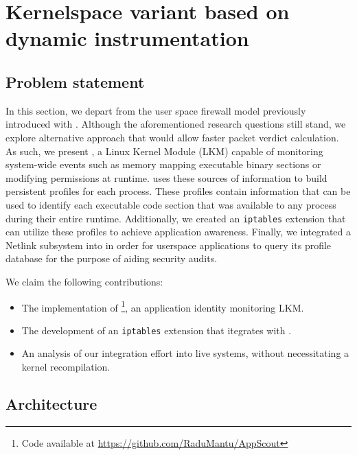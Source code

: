 \section{Kernelspace variant based on dynamic instrumentation}
\label{appfw:appscout}

\subsection{Problem statement}
\label{apffw:appscout:intro}

In this section, we depart from the user space firewall model previously introduced with \daf{}. Although the aforementioned research questions still stand, we explore alternative approach that would allow faster packet verdict calculation. As such, we present \scout{}, a Linux Kernel Module (LKM) capable of monitoring system-wide events such as memory mapping executable binary sections or modifying permissions at runtime. \scout{} uses these sources of information to build persistent profiles for each process. These profiles contain information that can be used to identify each executable code section that was available to any process during their entire runtime. Additionally, we created an \texttt{iptables} extension that can utilize these profiles to achieve application awareness. Finally, we integrated a Netlink subsystem into \scout{} in order for userspace applications to query its profile database for the purpose of aiding security audits.

We claim the following contributions:
\begin{itemize}
    \item The implementation of \scout{}\footnote{Code available at \url{https://github.com/RaduMantu/AppScout}}, an application identity monitoring LKM.

    \item The development of an \texttt{iptables} extension that itegrates with \scout{}.

    \item An analysis of our integration effort into live systems, without necessitating a kernel recompilation.
\end{itemize}

\subsection{Architecture}
\label{apffw:appscout:architecture}

